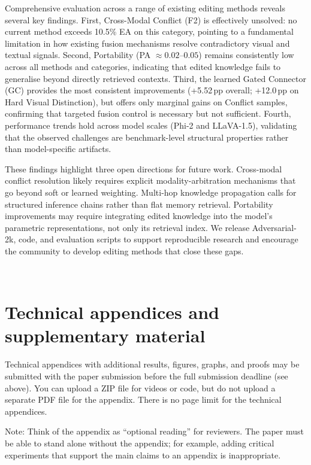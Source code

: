 \documentclass{article}
\begin{document}
Comprehensive evaluation across a range of existing editing methods reveals several key findings. First, Cross-Modal Conflict (F2) is effectively unsolved: no current method exceeds 10.5\% EA on this category, pointing to a fundamental limitation in how existing fusion mechanisms resolve contradictory visual and textual signals. Second, Portability (PA $\approx 0.02$--$0.05$) remains consistently low across all methods and categories, indicating that edited knowledge fails to generalise beyond directly retrieved contexts. Third, the learned Gated Connector (GC) provides the most consistent improvements (+5.52\,pp overall; +12.0\,pp on Hard Visual Distinction), but offers only marginal gains on Conflict samples, confirming that targeted fusion control is necessary but not sufficient. Fourth, performance trends hold across model scales (Phi-2 and LLaVA-1.5), validating that the observed challenges are benchmark-level structural properties rather than model-specific artifacts.

These findings highlight three open directions for future work. Cross-modal conflict resolution likely requires explicit modality-arbitration mechanisms that go beyond soft or learned weighting. Multi-hop knowledge propagation calls for structured inference chains rather than flat memory retrieval. Portability improvements may require integrating edited knowledge into the model's parametric representations, not only its retrieval index. We release Adversarial-2k, code, and evaluation scripts to support reproducible research and encourage the community to develop editing methods that close these gaps.


\


\appendix



\section{Technical appendices and supplementary material}
Technical appendices with additional results, figures, graphs, and proofs may be submitted with the paper submission before the full submission deadline (see above). You can upload a ZIP file for videos or code, but do not upload a separate PDF file for the appendix. There is no page limit for the technical appendices. 

Note: Think of the appendix as ``optional reading'' for reviewers. The paper must be able to stand alone without the appendix; for example, adding critical experiments that support the main claims to an appendix is inappropriate. 
\end{document}
